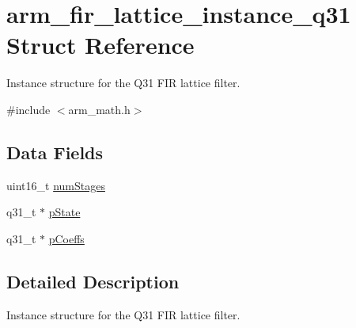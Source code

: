 \hypertarget{structarm__fir__lattice__instance__q31}{\section{arm\-\_\-fir\-\_\-lattice\-\_\-instance\-\_\-q31 Struct Reference}
\label{structarm__fir__lattice__instance__q31}
}


Instance structure for the Q31 F\-I\-R lattice filter.  




{\ttfamily \#include $<$arm\-\_\-math.\-h$>$}

\subsection*{Data Fields}
\begin{DoxyCompactItemize}
\item 
uint16\-\_\-t \hyperlink{structarm__fir__lattice__instance__q31_a4cceb90547b3e585d4c7aabaa8057212}{num\-Stages}
\item 
q31\-\_\-t $\ast$ \hyperlink{structarm__fir__lattice__instance__q31_adee4ba3ee8869865af7d8fa08ca913d6}{p\-State}
\item 
q31\-\_\-t $\ast$ \hyperlink{structarm__fir__lattice__instance__q31_a68888e36167d81cb7836db10367a1682}{p\-Coeffs}
\end{DoxyCompactItemize}


\subsection{Detailed Description}
Instance structure for the Q31 F\-I\-R lattice filter. 

